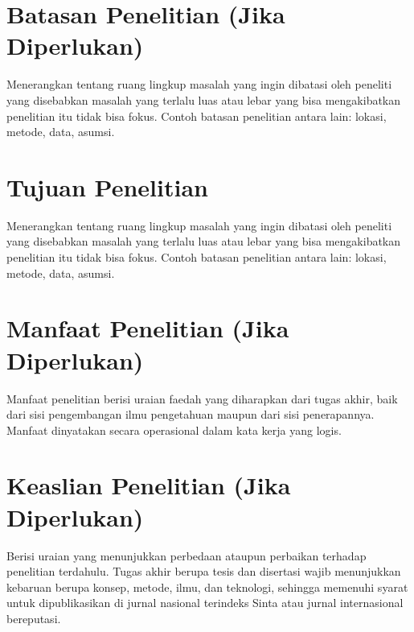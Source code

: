 \section{Batasan Penelitian (Jika Diperlukan)} %
Menerangkan tentang ruang lingkup masalah yang ingin dibatasi oleh peneliti yang disebabkan masalah yang terlalu luas atau lebar yang bisa mengakibatkan penelitian itu tidak bisa fokus. Contoh batasan penelitian antara lain: lokasi, metode, data, asumsi. 

\section{Tujuan Penelitian} %
Menerangkan tentang ruang lingkup masalah yang ingin dibatasi oleh peneliti yang disebabkan masalah yang terlalu luas atau lebar yang bisa mengakibatkan penelitian itu tidak bisa fokus. Contoh batasan penelitian antara lain: lokasi, metode, data, asumsi.

\section{Manfaat Penelitian (Jika Diperlukan)} %
Manfaat penelitian berisi uraian faedah yang diharapkan dari tugas akhir, baik dari sisi pengembangan ilmu pengetahuan maupun dari sisi penerapannya. Manfaat dinyatakan secara operasional dalam kata kerja yang logis.

\section{Keaslian Penelitian (Jika Diperlukan)} %
Berisi uraian yang menunjukkan perbedaan ataupun perbaikan terhadap penelitian terdahulu. Tugas akhir berupa tesis dan disertasi wajib menunjukkan kebaruan berupa konsep, metode, ilmu, dan teknologi, sehingga memenuhi syarat untuk dipublikasikan di jurnal nasional terindeks Sinta atau jurnal internasional bereputasi.